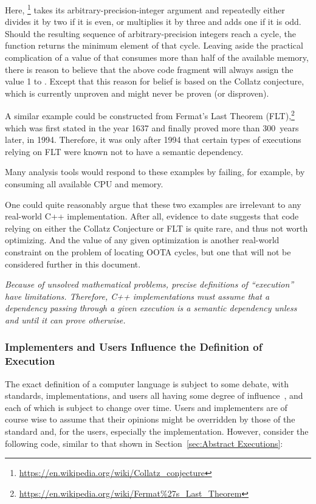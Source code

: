 \documentclass[10]{article}
\begin{document}
Here, \footnote{
	\url{https://en.wikipedia.org/wiki/Collatz_conjecture}}
takes its arbitrary-precision-integer argument and repeatedly either
divides it by two if it is even, or multiplies it by three and adds one
if it is odd.
Should the resulting sequence of arbitrary-precision integers reach
a cycle, the function returns the minimum element of that cycle.
Leaving aside the practical complication of a value of  that
consumes more than half of the available memory, there is reason to
believe that the above code fragment will always assign the value 1 to
.
Except that this reason for belief is based on the Collatz conjecture,
which is currently unproven and might never be proven (or disproven).

A similar example could be constructed from Fermat's Last Theorem
(FLT),\footnote{
\url{https://en.wikipedia.org/wiki/Fermat\%27s_Last_Theorem}}
which was first stated in the year 1637 and finally proved more than
300~years later, in 1994.
Therefore, it was only after 1994 that certain types of executions
relying on FLT were known not to have a semantic dependency.

Many analysis tools would respond to these examples by failing, for example,
by consuming all available CPU and memory.

One could quite reasonably argue that these two examples are irrelevant
to any real-world C++ implementation.
After all, evidence to date suggests that code relying on either the
Collatz Conjecture or FLT is quite rare, and thus not worth optimizing.
And the value of any given optimization is another real-world constraint
on the problem of locating OOTA cycles, but one that will not be considered
further in this document.

\emph{Because of unsolved mathematical problems, precise definitions of
``execution'' have limitations.
Therefore, C++ implementations must assume that a dependency passing
through a given execution is a semantic dependency unless and until it
can prove otherwise.}

\subsubsection{Implementers and Users Influence the Definition of Execution}
\label{sec:Implementers and Users Influence the Definition of Execution}

The exact definition of a computer language is subject to some debate,
with standards, implementations, and users all having some degree of
influence~\cite{KayvanMemarian2016DepthOfC-1,KayvanMemarian2016DepthOfC-2},
and each of which is subject to change over time.
Users  and implementers are of course wise to assume that their opinions
might be overridden by those of the standard and, for the users,
especially the implementation.
However, consider the following code, similar to that shown in
Section~\ref{sec:Abstract Executions}:
\end{document}
